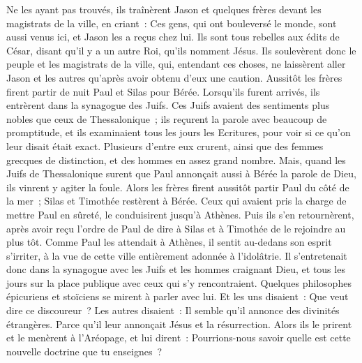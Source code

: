 \begin{multicols}{2}
Ne les ayant pas trouvés, ils traînèrent Jason et quelques frères devant les magistrats de la ville, en criant~: Ces gens, qui ont bouleversé le monde, sont aussi venus ici, et Jason les a reçus chez lui.
Ils sont tous rebelles aux édits de César, disant qu'il y a un autre Roi, qu'ils nomment Jésus.
Ils soulevèrent donc le peuple et les magistrats de la ville, qui, entendant ces choses,
ne laissèrent aller Jason et les autres qu'après avoir obtenu d'eux une caution.
Aussitôt les frères firent partir de nuit Paul et Silas pour Bérée. Lorsqu'ils furent arrivés, ils entrèrent dans la synagogue des Juifs.
Ces Juifs avaient des sentiments plus nobles que ceux de Thessalonique~; ils reçurent la parole avec beaucoup de promptitude, et ils examinaient tous les jours les Ecritures, pour voir si ce qu'on leur disait était exact.
Plusieurs d'entre eux crurent, ainsi que des femmes grecques de distinction, et des hommes en assez grand nombre.
Mais, quand les Juifs de Thessalonique surent que Paul annonçait aussi à Bérée la parole de Dieu, ils vinrent y agiter la foule.
Alors les frères firent aussitôt partir Paul du côté de la mer~; Silas et Timothée restèrent à Bérée.
Ceux qui avaient pris la charge de mettre Paul en sûreté, le conduisirent jusqu'à Athènes. Puis ils s'en retournèrent, après avoir reçu l'ordre de Paul de dire à Silas et à Timothée de le rejoindre au plus tôt.
Comme Paul les attendait à Athènes, il sentit au-dedans son esprit s'irriter, à la vue de cette ville entièrement adonnée à l'idolâtrie.
Il s'entretenait donc dans la synagogue avec les Juifs et les hommes craignant Dieu, et tous les jours sur la place publique avec ceux qui s'y rencontraient.
Quelques philosophes épicuriens et stoïciens se mirent à parler avec lui. Et les uns disaient~: Que veut dire ce discoureur~? Les autres disaient~: Il semble qu'il annonce des divinités étrangères. Parce qu'il leur annonçait Jésus et la résurrection.
Alors ils le prirent et le menèrent à l'Aréopage, et lui dirent~: Pourrions-nous savoir quelle est cette nouvelle doctrine que tu enseignes~?

\end{multicols}
